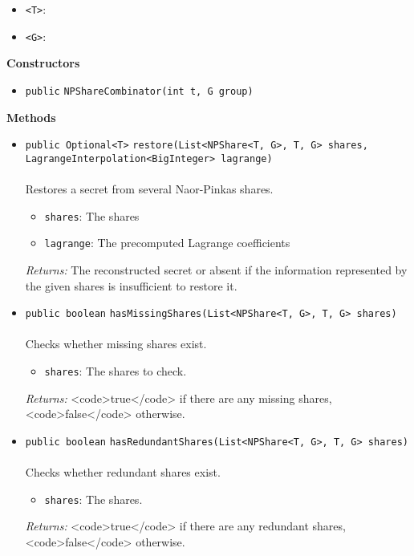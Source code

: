 \begin{itemize}
\item \lstinline|<T>|: 
\item \lstinline|<G>|: 
\end{itemize}



\textbf{\sffamily Constructors}
\begin{itemize}
\item \lstinline|public| \lstinline|NPShareCombinator|\lstinline|(int t, G group)| \\[-0.6em]




\end{itemize}


\textbf{\sffamily Methods}
\begin{itemize}
\item \lstinline|public Optional<T>| \lstinline|restore|\lstinline|(List<NPShare<T, G>, T, G> shares, LagrangeInterpolation<BigInteger> lagrange)|\\ \\[-0.6em]
Restores a secret from several Naor-Pinkas shares.
\begin{itemize}
\item \lstinline|shares|: The shares
\item \lstinline|lagrange|: The precomputed Lagrange coefficients
\end{itemize}

\emph{Returns:} The reconstructed secret or absent if the information represented
 by the given shares is insufficient to restore it.

\item \lstinline|public boolean| \lstinline|hasMissingShares|\lstinline|(List<NPShare<T, G>, T, G> shares)|\\ \\[-0.6em]
Checks whether missing shares exist.
\begin{itemize}
\item \lstinline|shares|: The shares to check.
\end{itemize}

\emph{Returns:} <code>true</code> if there are any missing shares, <code>false</code> otherwise.

\item \lstinline|public boolean| \lstinline|hasRedundantShares|\lstinline|(List<NPShare<T, G>, T, G> shares)|\\ \\[-0.6em]
Checks whether redundant shares exist.
\begin{itemize}
\item \lstinline|shares|: The shares.
\end{itemize}

\emph{Returns:} <code>true</code> if there are any redundant shares, <code>false</code> otherwise.

\end{itemize}

